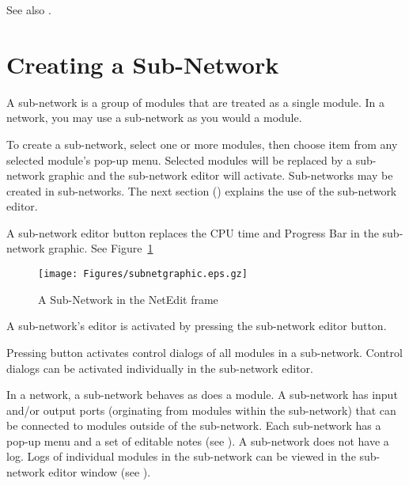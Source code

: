 See also .

\section{Creating a Sub-Network}
\label{sec:crsubnet}

\newcommand{\subnetgraphicfig}{%
  \centerline{\texttt{[image: Figures/subnetgraphic.eps.gz]}}
}
\begin{htmlonly}
  \newcommand{\subnetgraphicfig}{%
    \htmladdimg[alt="Graphic of a Sub-network"]{../Figures/subnetgraphic.gif}
  }
\end{htmlonly}


A sub-network is a group of modules that are treated as a single
module.  In a network, you may use a sub-network as you would a
module.

To create a sub-network, select one or more modules, then choose item
 from any selected module's pop-up menu.
Selected modules will be replaced by a sub-network graphic and the
sub-network editor will activate.  Sub-networks may be created in
sub-networks.  The next section () explains the use of the sub-network
editor.

A sub-network editor button replaces the CPU time and Progress
Bar in the sub-network graphic.  See Figure~\ref{fig:subnetgraphic}

\begin{figure}[htb]
  \centering
  \begin{makeimage} \end{makeimage}
  \subnetgraphicfig
  \caption{\label{fig:subnetgraphic} A Sub-Network in the NetEdit frame}
\end{figure}

A sub-network's editor is activated by pressing the
sub-network editor button.

Pressing button  activates control dialogs of all
modules in a sub-network.  Control dialogs can be activated
individually in the sub-network editor.

In a network, a sub-network behaves as does a module.  A sub-network
has input and/or output ports (orginating from modules within the
sub-network) that can be connected to modules outside of the
sub-network.  Each sub-network has a pop-up menu and a set of editable
notes (see ).  A sub-network does not have a log. Logs of
individual modules in the sub-network can be viewed in the sub-network
editor window (see ).

